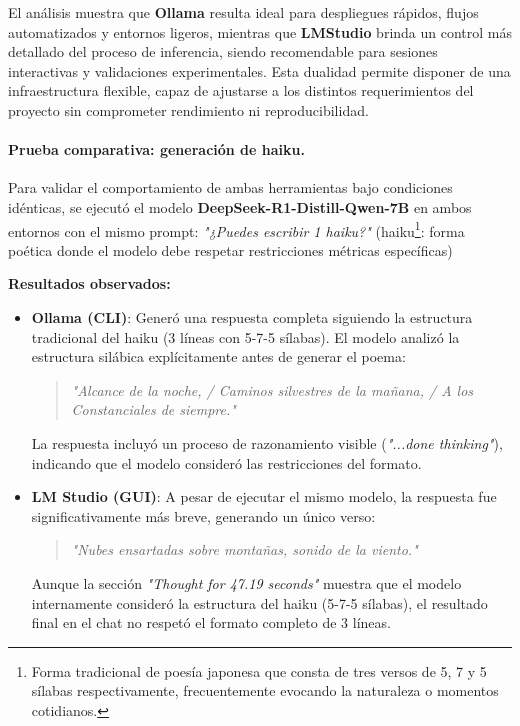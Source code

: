 \documentclass[12pt,a4paper]{report}
\numberwithin{figure}{section}
\begin{document}
\vspace{0.3em}

El análisis muestra que \textbf{Ollama} resulta ideal para despliegues rápidos, flujos automatizados y entornos ligeros, mientras que \textbf{LMStudio} brinda un control más detallado del proceso de inferencia, siendo recomendable para sesiones interactivas y validaciones experimentales. Esta dualidad permite disponer de una infraestructura flexible, capaz de ajustarse a los distintos requerimientos del proyecto sin comprometer rendimiento ni reproducibilidad.

\vspace{1em}
\paragraph{Prueba comparativa: generación de haiku.}

Para validar el comportamiento de ambas herramientas bajo condiciones idénticas, se ejecutó el modelo \textbf{DeepSeek-R1-Distill-Qwen-7B} en ambos entornos con el mismo prompt: \textit{"¿Puedes escribir 1 haiku?"} (haiku\footnote{Forma tradicional de poesía japonesa que consta de tres versos de 5, 7 y 5 sílabas respectivamente, frecuentemente evocando la naturaleza o momentos cotidianos.}: forma poética donde el modelo debe respetar restricciones métricas específicas)

\textbf{Resultados observados:}

\begin{itemize}
    \item \textbf{Ollama (CLI)}: Generó una respuesta completa siguiendo la estructura tradicional del haiku (3 líneas con 5-7-5 sílabas). El modelo analizó la estructura silábica explícitamente antes de generar el poema:
    \begin{quote}
        \textit{"Alcance de la noche, / Caminos silvestres de la mañana, / A los Constanciales de siempre."}
    \end{quote}
    La respuesta incluyó un proceso de razonamiento visible (\textit{"...done thinking"}), indicando que el modelo consideró las restricciones del formato.

    \item \textbf{LM Studio (GUI)}: A pesar de ejecutar el mismo modelo, la respuesta fue significativamente más breve, generando un único verso:
    \begin{quote}
        \textit{"Nubes ensartadas sobre montañas, sonido de la viento."}
    \end{quote}
    Aunque la sección \textit{"Thought for 47.19 seconds"} muestra que el modelo internamente consideró la estructura del haiku (5-7-5 sílabas), el resultado final en el chat no respetó el formato completo de 3 líneas.
\end{itemize}
\end{document}
